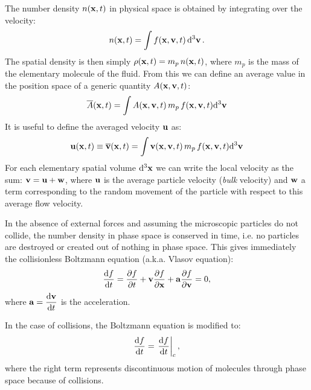 The number density $n(\boldsymbol{\mathbf{x}}, t)$ in physical space is obtained by integrating over the velocity:
\begin{equation}
n(\boldsymbol{\mathbf{x}}, t ) = \int f(\boldsymbol{\mathbf{x}}, \boldsymbol{\mathbf{v}}, t) \dd[3]{\boldsymbol{\mathbf{v}}}.
\end{equation}
The spatial density is then simply $\rho(\boldsymbol{\mathbf{x}}, t) = m_p\,n(\boldsymbol{\mathbf{x}}, t)$, where $m_p$ is the mass of the elementary molecule of the fluid.
From this we can define an average value in the position space of a generic quantity $A(\boldsymbol{\mathbf{x}}, \boldsymbol{\mathbf{v}}, t)$:
\begin{equation}
 \label{eq:df_average}
 \overline{A} (\boldsymbol{\mathbf{x}}, t) = \int{A(\boldsymbol{\mathbf{x}}, \boldsymbol{\mathbf{v}}, t)\, m_p\, f(\boldsymbol{\mathbf{x}}, \boldsymbol{\mathbf{v}}, t) \dd[3] \boldsymbol{\mathbf{v}}}
\end{equation}
It is useful to define the averaged velocity $\boldsymbol{\mathbf{u}}$ as:
\begin{equation}
  \boldsymbol{\mathbf{u}}(\boldsymbol{\mathbf{x}}, t) \equiv \overline{\boldsymbol{\mathbf{v}}}(\boldsymbol{\mathbf{x}}, t) = \int{\boldsymbol{\mathbf{v}}(\boldsymbol{\mathbf{x}}, \boldsymbol{\mathbf{v}}, t)\, m_p\, f(\boldsymbol{\mathbf{x}}, \boldsymbol{\mathbf{v}}, t) \dd[3] \boldsymbol{\mathbf{v}}}
\end{equation}
For each elementary spatial volume $\dd[3] \boldsymbol{\mathbf{x}}$ we can write the local velocity as the sum: $\boldsymbol{\mathbf{v}} = \boldsymbol{\mathbf{u}} + \boldsymbol{\mathbf{w}}$, where $\boldsymbol{\mathbf{u}}$ is the average particle velocity (\emph{bulk} velocity) and $\boldsymbol{\mathbf{w}}$ a term corresponding to the random movement of the particle with respect to this average flow velocity.

In the absence of external forces and assuming the microscopic particles do not collide, the number density in phase space is conserved in time, i.e. no particles are destroyed or created out of nothing in phase space.
This gives immediately the collisionless Boltzmann equation (a.k.a. Vlasov equation):
\begin{equation}
\label{eq:vlasov}
\dv{f}{t}(\boldsymbol{\mathbf{x}}, \boldsymbol{\mathbf{v}}, t) = \pdv{f}{t} + \boldsymbol{\mathbf{v}} \pdv{f}{\boldsymbol{\mathbf{x}}} + \boldsymbol{\mathbf{a}} \pdv{f}{\boldsymbol{\mathbf{v}}} = 0,
\end{equation}
where $\displaystyle \boldsymbol{\mathbf{a}} = \dv{\boldsymbol{\mathbf{v}}}{t}$ is the acceleration.

In the case of collisions, the Boltzmann equation is modified to:
\begin{equation}
\label{eq:boltzmann}
\dv{f}{t}(\boldsymbol{\mathbf{x}}, \boldsymbol{\mathbf{v}}, t) = \left.\dv{f}{t}\right|_c,
\end{equation}
where the right term represents discontinuous motion of molecules through phase space because of collisions.

